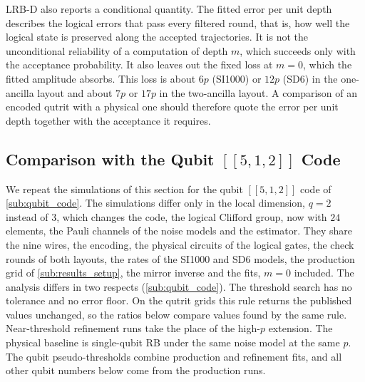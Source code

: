 LRB-D also reports a conditional quantity. The fitted error per unit depth describes the logical errors that pass every filtered round, that is, how well the logical state is preserved along the accepted trajectories. It is not the unconditional reliability of a computation of depth $m$, which succeeds only with the acceptance probability. It also leaves out the fixed loss at $m = 0$, which the fitted amplitude absorbs. This loss is about $6p$ (SI1000) or $12p$ (SD6) in the one-ancilla layout and about $7p$ or $17p$ in the two-ancilla layout. A comparison of an encoded qutrit with a physical one should therefore quote the error per unit depth together with the acceptance it requires.

\subsection{Comparison with the Qubit \texorpdfstring{$[[5,1,2]]$}{[[5,1,2]]} Code}
\label{sub:qubit_comparison}

We repeat the simulations of this section for the qubit $[[5,1,2]]$ code of \autoref{sub:qubit_code}. The simulations differ only in the local dimension, $q = 2$ instead of $3$, which changes the code, the logical Clifford group, now with $24$ elements, the Pauli channels of the noise models and the estimator. They share the nine wires, the encoding, the physical circuits of the logical gates, the check rounds of both layouts, the rates of the SI1000 and SD6 models, the production grid of \autoref{sub:results_setup}, the mirror inverse and the fits, $m = 0$ included. The analysis differs in two respects (\autoref{sub:qubit_code}). The threshold search has no tolerance and no error floor. On the qutrit grids this rule returns the published values unchanged, so the ratios below compare values found by the same rule. Near-threshold refinement runs take the place of the high-$p$ extension. The physical baseline is single-qubit RB under the same noise model at the same $p$. The qubit pseudo-thresholds combine production and refinement fits, and all other qubit numbers below come from the production runs.

